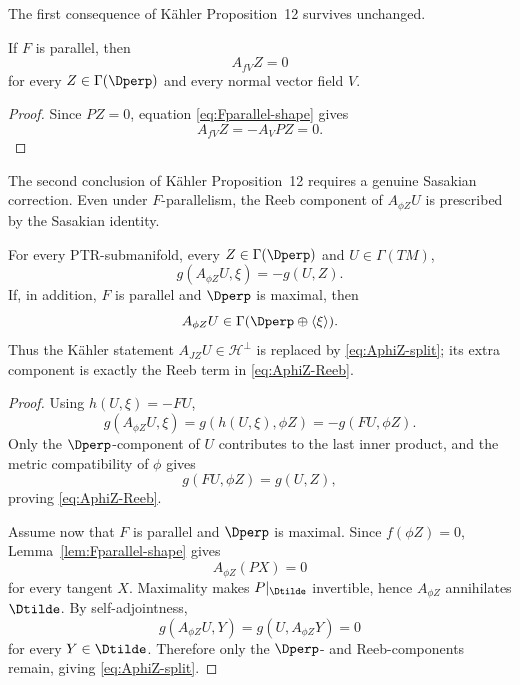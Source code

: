 \documentclass[11pt]{article}
\theoremstyle{definition}\newtheorem{definition}[theorem]{Definition}\newtheorem{example}[theorem]{Example}
\theoremstyle{remark}\newtheorem{remark}[theorem]{Remark}
\begin{document}
The first consequence of K\"ahler Proposition~12 survives unchanged.

\begin{proposition}\label{prop:Fparallel-one}
If $F$ is parallel, then
\begin{equation}\label{eq:AfV-Dperp}
 A_{fV}Z=0
\end{equation}
for every $Z\in\Gamma(\Dperp)$ and every normal vector field $V$.
\end{proposition}
\begin{proof}
Since $PZ=0$, equation \eqref{eq:Fparallel-shape} gives
\[
 A_{fV}Z=-A_VPZ=0.
\]
\end{proof}



The second conclusion of K\"ahler Proposition~12 requires a genuine Sasakian correction.  Even under $F$-parallelism, the Reeb component of $A_{\phi Z}U$ is prescribed by the Sasakian identity.

\begin{proposition}\label{prop:Fparallel-Reebshape}
For every PTR-submanifold, every $Z\in\Gamma(\Dperp)$ and $U\in\Gamma(TM)$,
\begin{equation}\label{eq:AphiZ-Reeb}
 g(A_{\phi Z}U,\xi)=-g(U,Z).
\end{equation}
If, in addition, $F$ is parallel and $\Dperp$ is maximal, then
\begin{equation}\label{eq:AphiZ-split}
 A_{\phi Z}U\in\Gamma(\Dperp\oplus\langle\xi\rangle).
\end{equation}
Thus the K\"ahler statement $A_{JZ}U\in\mathcal H^\perp$ is replaced by \eqref{eq:AphiZ-split}; its extra component is exactly the Reeb term in \eqref{eq:AphiZ-Reeb}.
\end{proposition}
\begin{proof}
Using $h(U,\xi)=-FU$,
\[
 g(A_{\phi Z}U,\xi)=g(h(U,\xi),\phi Z)=-g(FU,\phi Z).
\]
Only the $\Dperp$-component of $U$ contributes to the last inner product, and the metric compatibility of $\phi$ gives
\[
 g(FU,\phi Z)=g(U,Z),
\]
proving \eqref{eq:AphiZ-Reeb}.

Assume now that $F$ is parallel and $\Dperp$ is maximal.  Since $f(\phi Z)=0$, Lemma~\ref{lem:Fparallel-shape} gives
\[
 A_{\phi Z}(PX)=0
\]
for every tangent $X$.  Maximality makes $P|_{\Dtilde}$ invertible, hence $A_{\phi Z}$ annihilates $\Dtilde$.  By self-adjointness,
\[
 g(A_{\phi Z}U,Y)=g(U,A_{\phi Z}Y)=0
\]
for every $Y\in\Dtilde$.  Therefore only the $\Dperp$- and Reeb-components remain, giving \eqref{eq:AphiZ-split}.
\end{proof}
\end{document}
